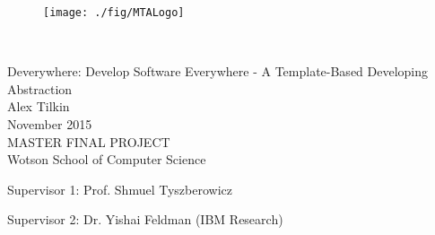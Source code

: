 
\thispagestyle{empty}
\begin{figure}
\centering
\texttt{[image: ./fig/MTALogo]}
\end{figure}

\mbox{}\\[6pc]
\begin{center}
\Huge{Deverywhere: Develop Software Everywhere - A Template-Based Developing Abstraction}\\[2pc]

\Large{Alex Tilkin}\\[1pc]
\large{November 2015}\\[2pc]

MASTER FINAL PROJECT\\
Wotson School of Computer Science\\
\end{center}
\vfill

\noindent Supervisor 1: Prof. Shmuel Tyszberowicz

\noindent Supervisor 2: Dr. Yishai Feldman (IBM Research)

